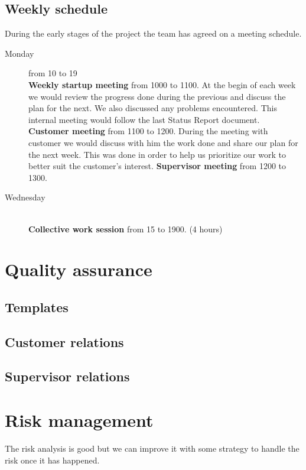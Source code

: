 \subsection{Weekly schedule}
During the early stages of the project the team has agreed on a meeting schedule.

\begin{description}
\item[Monday] \hfill from 10 to 19 \\
\textbf{Weekly startup meeting} from 1000 to 1100.\newline
At the begin of each week we would review the progress done during the previous and discuss the plan for the next.
We also discussed any problems encountered.
This internal meeting would follow the last Status Report document.
\textbf{Customer meeting} from 1100 to 1200.\newline
During the meeting with customer we would discuss with him the work done and share our plan for the next week.
This was done in order to help us prioritize our work to better suit the customer's interest.
\textbf{Supervisor meeting} from 1200 to 1300.
\item[Wednesday] \hfill \\
\textbf{Collective work session} from 15 to 1900. (4 hours)
\end{description}


\section{Quality assurance}
\subsection{Templates}
\subsection{Customer relations}
\subsection{Supervisor relations}

\section{Risk management}

The risk analysis is good but we can improve it with some strategy to handle the risk once it has happened.
